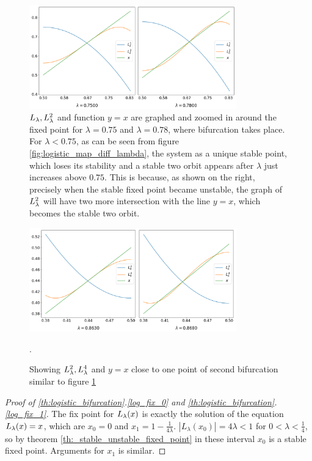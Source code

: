 \begin{figure}[htbp]
	\centering
	\includegraphics[width=0.8\textwidth]{./figures/logistic_map_around_bifurcation.png}
	\caption{
		$L_{\lambda}, L_{\lambda}^2$ and function $y=x$ are graphed and zoomed in around the fixed point for $\lambda = 0.75$ and $\lambda = 0.78$, where bifurcation takes place.
		For $\lambda < 0.75$, as can be seen from figure \ref{fig:logistic_map_diff_lambda}, the system as a unique stable point,
		which loses its stability and a stable two orbit appears after $\lambda$ just increases above $0.75$.
		This is because, as shown on the right, precisely when the stable fixed point became unstable, the graph of $L_{\lambda}^2$ will have two more intersection with the line $y=x$, which becomes the stable two orbit.
	}
	\label{fig:point_of_bifurcation1}
\end{figure}

\begin{figure}[htbp]
	\centering
	\includegraphics[width=0.8\textwidth]{./figures/logistic_map_around_bifurcation_2.png}
	\caption{Showing $L_{\lambda}^2, L_{\lambda}^4$ and $y=x$ close to one point of second bifurcation similar to figure \ref{fig:point_of_bifurcation1}}.
	\label{fig:point_of_bifurcation2}
\end{figure}

\begin{proof}[Proof of \ref{th:logistic_bifurcation}.\ref{log_fix_0} and \ref{th:logistic_bifurcation}.\ref{log_fix_1}]
	The fix point for $L_{\lambda}(x)$ is exactly the solution of the equation $L_{\lambda}(x) = x$, which are $x_0 = 0$ and $x_1 = 1 - \frac{1}{4\lambda}$. 
	$|L_{\lambda}(x_0) | = 4 \lambda < 1$ for $0 < \lambda < \frac{1}{4}$, so by theorem \ref{th:_stable_unstable_fixed_point} in these interval $x_0$ is a stable fixed point.
	Arguments for $x_1$ is similar.
\end{proof}

